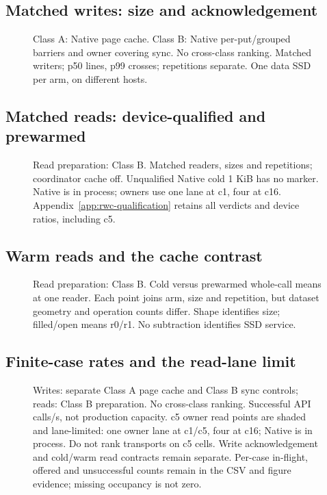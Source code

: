 \clearpage
\subsection{Matched writes: size and acknowledgement}
\begin{figure}[H]\centering{}
\caption{Class A: Native page cache. Class B: Native per-put/grouped barriers and owner covering sync. No cross-class ranking. Matched writers; p50 lines, p99 crosses; repetitions separate. One data SSD per arm, on different hosts.}
\end{figure}


\clearpage
\subsection{Matched reads: device-qualified and prewarmed}
\begin{figure}[H]\centering{}
\caption{Read preparation: Class B. Matched readers, sizes and repetitions; coordinator cache off. Unqualified Native cold 1 KiB has no marker. Native is in process; owners use one lane at c1, four at c16. Appendix~\ref{app:rwc-qualification} retains all verdicts and device ratios, including c5.}
\end{figure}


\clearpage
\subsection{Warm reads and the cache contrast}

\begin{figure}[H]\centering{}
\caption{Read preparation: Class B. Cold versus prewarmed whole-call means at one reader. Each point joins arm, size and repetition, but dataset geometry and operation counts differ. Shape identifies size; filled/open means r0/r1. No subtraction identifies SSD service.}
\end{figure}

\clearpage
\subsection{Finite-case rates and the read-lane limit}
\begin{figure}[H]\centering{}
\caption{Writes: separate Class A page cache and Class B sync controls; reads: Class B preparation. No cross-class ranking. Successful API calls/s, not production capacity. c5 owner read points are shaded and lane-limited: one owner lane at c1/c5, four at c16; Native is in process. Do not rank transports on c5 cells. Write acknowledgement and cold/warm read contracts remain separate. Per-case in-flight, offered and unsuccessful counts remain in the CSV and figure evidence; missing occupancy is not zero.}
\end{figure}

